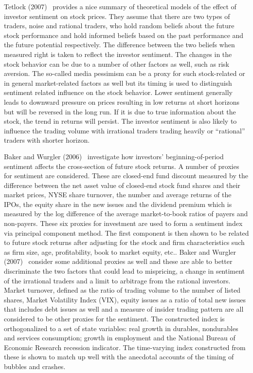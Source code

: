  
 Tetlock (2007)~\cite{tetlock2007giving} provides a nice summary of theoretical models of the effect of investor sentiment on stock prices. They assume that there are two types of traders, noise and rational traders, who hold random beliefs about the future stock performance and hold informed beliefs based on the past performance and the future potential respectively. The difference between the two beliefs when measured right is taken to reflect the investor sentiment. The changes in the stock behavior can be due to a number of other factors as well, such as risk aversion. The so-called media pessimism can be a proxy for such stock-related or in general market-related factors as well but its timing is used to distinguish sentiment related influence on the stock behavior. Lower sentiment generally leads to downward pressure on prices resulting in low returns at short horizons but will be reversed in the long run. If it is due to true information about the stock, the trend in returns will persist. The investor sentiment is also likely to influence the trading volume with irrational traders trading heavily or ``rational'' traders with shorter horizon.
 
 
 Baker and Wurgler (2006)~\cite{baker2006investor} investigate how investors' beginning-of-period sentiment affects the cross-section of future stock returns. A number of proxies for sentiment are considered. These are closed-end fund discount measured by the difference between the net asset value of closed-end stock fund shares and their market prices, NYSE share turnover, the number and average returns of the IPOs, the equity share in the new issues and the dividend premium which is measured by the log difference of the average market-to-book ratios of payers and non-payers. These six proxies for investment are used to form a sentiment index via principal component method. The first component is then shown to be related to future stock returns after adjusting for the stock and firm characteristics such as firm size, age, profitability, book to market equity, etc.. Baker and Wurgler (2007)~\cite{baker2007investor} consider some additional proxies as well and these are able to better discriminate the two factors that could lead to mispricing, a change in sentiment of the irrational traders and a limit to arbitrage from the rational investors. Market turnover, defined as the ratio of trading volume to the number of listed shares, Market Volatility Index (VIX), equity issues as a ratio of total new issues that includes debt issues as well and a measure of insider trading pattern are all considered to be other proxies for the sentiment. The constructed index is orthogonalized to a set of state variables: real growth in durables, nondurables and services consumption; growth in employment and the National Bureau of Economic Research recession indicator. The time-varying index constructed from these is shown to match up well with the anecdotal accounts of the timing of bubbles and crashes.
 
